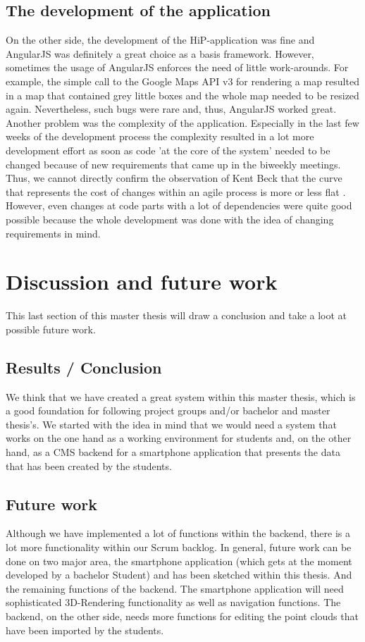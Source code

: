 \subsection{The development of the application}
On the other side, the development of the \ac{HiP}-application was fine and AngularJS was definitely a great choice as a basis framework. However, sometimes the usage of AngularJS enforces the need of little work-arounds. For example, the simple call to the Google Maps API v3 for rendering a map resulted in a map that contained grey little boxes and the whole map needed to be resized again. Nevertheless, such bugs were rare and, thus, AngularJS worked great. 
Another problem was the complexity of the application. Especially in the last few weeks of the development process the complexity resulted in a lot more development effort as soon as code 'at the core of the system' needed to be changed because of new requirements that came up in the biweekly meetings. Thus, we cannot directly confirm the observation of Kent Beck that the curve that represents the cost of changes within an agile process is more or less flat \cite{beck2003test}. However, even changes at code parts with a lot of dependencies were quite good possible because the whole development was done with the idea of changing requirements in mind. 

\section{Discussion and future work}
This last section of this master thesis will draw a conclusion and take a loot at possible future work.

\subsection{Results / Conclusion}
We think that we have created a great system within this master thesis, which is a good foundation for following project groups and/or bachelor and master thesis's. We started with the idea in mind that we would need a system that works on the one hand as a working environment for students and, on the other hand, as a \ac{CMS} backend for a smartphone application that presents the data that has been created by the students. 

\subsection{Future work}
Although we have implemented a lot of functions within the backend, there is a lot more functionality within our Scrum backlog. In general, future work can be done on two major area, the smartphone application (which gets at the moment developed by a bachelor Student) and has been sketched within this thesis. And the remaining functions of the backend. The smartphone application will need sophisticated 3D-Rendering functionality as well as navigation functions. The backend, on the other side, needs more functions for editing the point clouds that have been imported by the students.
